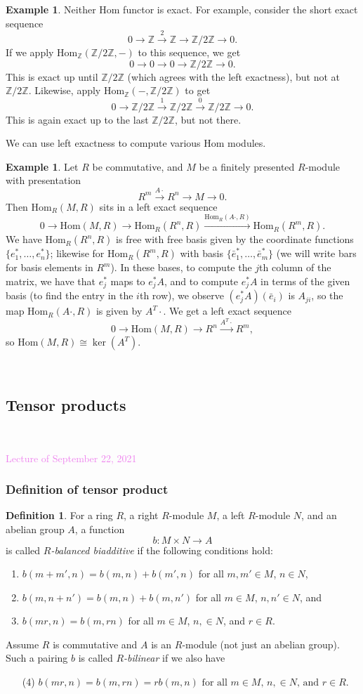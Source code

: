 \documentclass{amsart}[12pt]
\def\ker{\operatorname{ker}}
\newcommand{\Hom}{\mathrm{Hom}}
\newcommand{\Sept}[1]{\textcolor{violet}{Lecture of September #1, 2021}}
\newcommand{\Z}{\mathbb{Z}}
\newcommand{\DEF}[1]{\emph{#1}\index{#1}}
\numberwithin{equation}{section}
\theoremstyle{plain} %
\theoremstyle{definition}
\newtheorem{defn}[equation]{Definition}
\newtheorem{ex}[equation]{Example}
\theoremstyle{remark}
\newcommand{\ssec}[1]{\subsection{#1}}
\newcommand{\sssec}[1]{\subsubsection{#1}}
\newcommand{\xra}[1]{\xrightarrow{#1}}
\begin{document}
\begin{ex} Neither Hom functor is exact. For example, consider the short exact sequence
\[ 0 \to \Z \xra{2} \Z \to \Z/2\Z \to 0.\]
If we apply $\Hom_\Z(\Z/2\Z ,-)$ to this sequence, we get
\[ 0 \to 0 \to 0 \to \Z/2\Z \to 0.\]
This is exact up until $\Z/2\Z$ (which agrees with the left exactness), but not at $\Z/2\Z$.
Likewise, apply $\Hom_\Z(-,\Z/2\Z)$ to get
\[ 0 \to \Z/2\Z \xra{1} \Z/2\Z \xra{0} \Z/2\Z \to 0.\]
This is again exact up to the last $\Z/2\Z$, but not there.
\end{ex}

We can use left exactness to compute various Hom modules. 

\begin{ex} Let $R$ be commutative, and $M$ be a finitely presented $R$-module with presentation
\[  R^m \xra{A\cdot} R^n \to M \to 0.\]
Then $\Hom_R(M,R)$ sits in a left exact sequence
\[ 0\to \Hom(M,R) \to \Hom_R(R^n,R) \xra{\Hom_R(A\cdot, R)} \Hom_R(R^m,R). \]
We have $\Hom_R(R^n,R)$ is free with free basis given by the coordinate functions $\{e_1^*,\dots,e_n^*\}$; likewise for $\Hom_R(R^m,R)$ with basis $\{ \bar{e}_1^*,\dots,\bar{e}_m^*\}$ (we will write bars for basis elements in $R^m$). In these bases, to compute the $j$th column of the matrix,
we have that $e_j^*$ maps to $e_j^* A$, and to compute $e_j^*A$ in terms of the given basis (to find the entry in the $i$th row), we observe $(e_j^*A)(\bar{e}_i)$ is $A_{ji}$, so the map $\Hom_R(A\cdot, R)$ is given by $A^T \cdot$.  We get a left exact sequence
\[ 0\to \Hom(M,R) \to R^n \xra{A^T \cdot} R^m,\]
so $\Hom(M,R)\cong \ker(A^T)$.
\end{ex}

\



\ssec{Tensor products}

\

\Sept{22}

\sssec{Definition of tensor product}

\begin{defn} 
For a ring $R$, a right $R$-module $M$, a left $R$-module $N$, and an abelian group $A$, a function
$$
b: M \times N \to A
$$
is called \DEF{$R$-balanced biadditive} if the following conditions hold:
\begin{enumerate}
\item $b(m+m', n) = b(m, n) + b(m', n)$ for all $m, m' \in M$, $n \in N$,
\item $b(m,n +n') = b(m, n) + b(m, n')$ for all $m \in M$, $n, n' \in N$, and
\item $b(mr, n) = b(m, rn)$ for all $m \in M$, $n, \in N$, and $r \in R$.
\end{enumerate}

Assume $R$ is commutative and $A$ is an $R$-module
(not just an abelian group). Such a pairing $b$ is called
  \DEF{$R$-bilinear} if we also have
\begin{enumerate}
  \item[(4)]
    $b(mr, n) = b(m, rn) = rb(m,n) \text{ for all $m \in M$, $n, \in N$, and $r \in R$.}$
\end{enumerate}
\end{defn}
\end{document}
